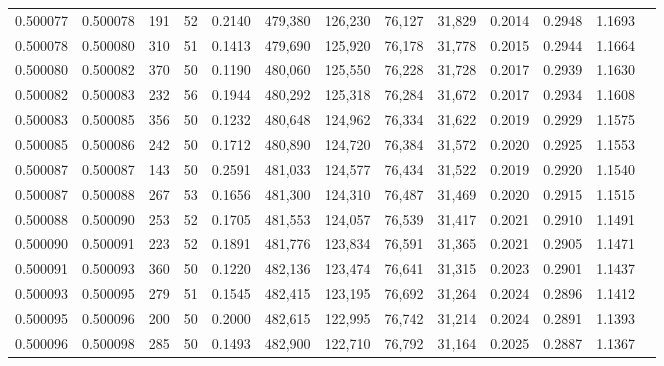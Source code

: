 \begin{tabular}{rrrrrrrrrrrrr}
0.500077 & 0.500078 & 191 &  52 &                                     0.2140 & 479,380 & 126,230 &  76,127 &  31,829 & 0.2014 & 0.2948 & 1.1693 \\
0.500078 & 0.500080 & 310 &  51 &                                     0.1413 & 479,690 & 125,920 &  76,178 &  31,778 & 0.2015 & 0.2944 & 1.1664 \\
0.500080 & 0.500082 & 370 &  50 &                                     0.1190 & 480,060 & 125,550 &  76,228 &  31,728 & 0.2017 & 0.2939 & 1.1630 \\
0.500082 & 0.500083 & 232 &  56 &                                     0.1944 & 480,292 & 125,318 &  76,284 &  31,672 & 0.2017 & 0.2934 & 1.1608 \\
0.500083 & 0.500085 & 356 &  50 &                                     0.1232 & 480,648 & 124,962 &  76,334 &  31,622 & 0.2019 & 0.2929 & 1.1575 \\
0.500085 & 0.500086 & 242 &  50 &                                     0.1712 & 480,890 & 124,720 &  76,384 &  31,572 & 0.2020 & 0.2925 & 1.1553 \\
0.500087 & 0.500087 & 143 &  50 &                                     0.2591 & 481,033 & 124,577 &  76,434 &  31,522 & 0.2019 & 0.2920 & 1.1540 \\
0.500087 & 0.500088 & 267 &  53 &                                     0.1656 & 481,300 & 124,310 &  76,487 &  31,469 & 0.2020 & 0.2915 & 1.1515 \\
0.500088 & 0.500090 & 253 &  52 &                                     0.1705 & 481,553 & 124,057 &  76,539 &  31,417 & 0.2021 & 0.2910 & 1.1491 \\
0.500090 & 0.500091 & 223 &  52 &                                     0.1891 & 481,776 & 123,834 &  76,591 &  31,365 & 0.2021 & 0.2905 & 1.1471 \\
0.500091 & 0.500093 & 360 &  50 &                                     0.1220 & 482,136 & 123,474 &  76,641 &  31,315 & 0.2023 & 0.2901 & 1.1437 \\
0.500093 & 0.500095 & 279 &  51 &                                     0.1545 & 482,415 & 123,195 &  76,692 &  31,264 & 0.2024 & 0.2896 & 1.1412 \\
0.500095 & 0.500096 & 200 &  50 &                                     0.2000 & 482,615 & 122,995 &  76,742 &  31,214 & 0.2024 & 0.2891 & 1.1393 \\
0.500096 & 0.500098 & 285 &  50 &                                     0.1493 & 482,900 & 122,710 &  76,792 &  31,164 & 0.2025 & 0.2887 & 1.1367 \\

\end{tabular}
